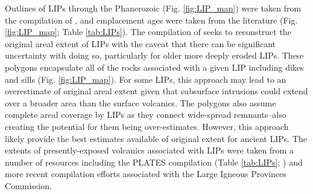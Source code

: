 \documentclass[11pt,letterpaper]{article}
\begin{document}
Outlines of LIPs through the Phanerozoic (Fig. \ref{fig:LIP_map}) were taken from the compilation of \citet{Ernst2017a}, and emplacement ages were taken from the literature (Fig. \ref{fig:LIP_map}; Table \ref{tab:LIPs}). The compilation of \citet{Ernst2017a} seeks to reconstruct the original areal extent of LIPs with the caveat that there can be significant uncertainty with doing so, particularly for older more deeply eroded LIPs. These polygons encapsulate all of the rocks associated with a given LIP including dikes and sills (Fig. \ref{fig:LIP_map}). For some LIPs, this approach may lead to an overestimate of original areal extent given that subsurface intrusions could extend over a broader area than the surface volcanics. The polygons also assume complete areal coverage by LIPs as they connect wide-spread remnants--also creating the potential for them being over-estimates. However, this approach likely provide the best estimates available of original extent for ancient LIPs.  The extents of presently-exposed volcanics associated with LIPs were taken from a number of resources including the PLATES compilation (Table \ref{tab:LIPs}; \citealp{Coffin2006a}) and more recent compilation efforts associated with the Large Igneous Provinces Commission. 
\end{document}
